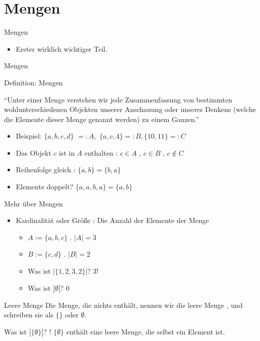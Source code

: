 \documentclass{beamer}
\begin{document}
\section{Mengen}


\begin{frame}{Mengen}
	\begin{itemize}
		 \item Erster wirklich wichtiger Teil.
	\end{itemize}
\end{frame}

\begin{frame}{Mengen}
	\begin{block}{Definition: Mengen}
		 
		``Unter einer Menge verstehen wir jede
		Zusammenfassung von bestimmten
		wohlunterschiedenen Objekten unserer
		Anschauung oder unseres Denkens (welche die
		Elemente dieser Menge genannt werden) zu einem
		Ganzen.''
	\end{block}
	
	\begin{itemize}
		\item Beispiel: $\{a, b, c, d\}$ $ =: A,$ $\{a, c, 4\} =: B, \{10, 11\} =: C$
		\item Das Objekt $c$ ist in $A$ enthalten  : $c \in A$  , $c \in B$  , $c \notin C$
		\item Reihenfolge gleich  : $\{a, b\} = \{b, a\}$
		\item Elemente doppelt?   $\{a, a, b, a\} = \{a, b\}$
	\end{itemize}
\end{frame}

\begin{frame}{Mehr über Mengen}
	\begin{itemize}
		\item Kardinalität   oder Größe  : Die Anzahl der Elemente der Menge
		\begin{itemize}
			\item $A := \{a, b, c\}$  . $|A| = 3$
			\item $B := \{c, d\}$  . $|B| = 2$
			\item Was ist $|\{1, 2, 3, 2\}|$? \pause $3$!
			\item Was ist $|\emptyset|?$ \pause $0$
		\end{itemize}
	\end{itemize}
	
	 
	
	\begin{block}{Leere Menge}
		Die Menge, die nichts enthält, nennen wir die leere Menge  , und schreiben sie als $\{\}$ oder $\emptyset$.
	\end{block}
	
	 
	
	Was ist $|\{\emptyset\}|$? !   $\{\emptyset\}$ enthält eine leere Menge, die selbst ein Element ist.
\end{frame}
\end{document}
